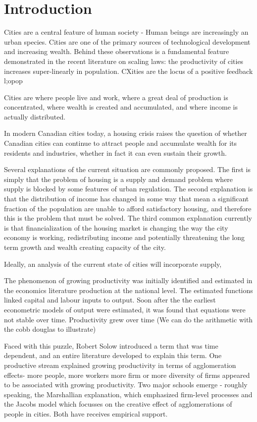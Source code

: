 \chapter{Introduction}

Cities are a central feature of human society - Human beings are increasingly an urban species. Cities are one of the primary sources of technological development and increasing wealth. Behind these observations is a fundamental feature demonstrated in the recent literature on scaling laws: the productivity of cities increases super-linearly in population. CXities are the locus of a positive feedback l;opop

Cities are where people live and work, where a great deal of production is concentrated, where wealth is created and accumulated, and where income is actually distributed. 

In modern Canadian cities today, a housing crisis raises the question of whether Canadian cities can continue to attract people and accumulate wealth for its residents and industries, whether in fact it can even sustain their growth.

Several explanations of the current situation are commonly proposed. The first is simply that the problem of housing is a supply and demand problem where supply is blocked by some features of urban regulation. The second explanation is that the distribution of income has changed in some way that mean a significant fraction of the population are unable to afford satisfactory housing, and therefore this is the problem that must be solved.  The third common explanation currently is that financialization of the housing market  is changing the way the city economy is working, redistributing income and potentially threatening the long term growth and wealth creating capacity of the city.

Ideally, an analysis of the current state of cities will incorporate supply, 

The phenomenon of growing productivity was initially identified and estimated in the economics literature production at the national level. The estimated functions linked capital and labour inputs to output.  Soon after the  the earliest econometric models of output  were estimated, it was found that equations were not stable over time. Productivity grew over time
(We can do the arithmetic with the cobb douglas to illustrate) 

Faced with this puzzle, Robert Solow introduced a term that was time dependent, and an entire literature developed to explain this term. One productive stream explained growing productivity in terms of agglomeration effects- more people, more workers more firm or more diversity of firms appeared to be associated with growing productivity. Two major schools emerge - roughly speaking,  the Marshallian explanation, which emphasized firm-level processes and the Jacobs model which focusses on the creative effect of agglomerations of people in cities. Both have receives empirical support.

